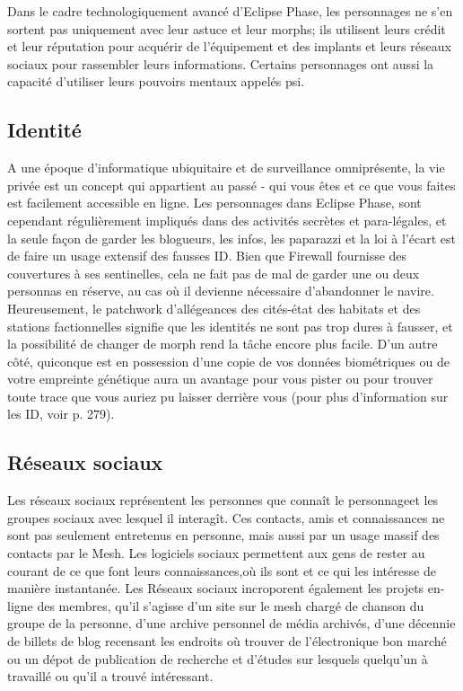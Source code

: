 Dans le cadre technologiquement avancé d'Eclipse Phase, les personnages ne s'en sortent pas uniquement avec leur astuce et leur morphs; ils utilisent leurs crédit et leur réputation pour acquérir de l'équipement et des implants et leurs réseaux sociaux pour rassembler leurs informations. Certains personnages ont aussi la capacité d'utiliser leurs pouvoirs mentaux appelés psi. 

\subsection{Identité} \label{sec:identity} 

A une époque d'informatique ubiquitaire et de surveillance omniprésente, la vie privée est un concept qui appartient au passé - qui vous êtes et ce que vous faites est facilement accessible en ligne. Les personnages dans Eclipse Phase, sont cependant régulièrement impliqués dans des activités secrètes et para-légales, et la seule façon de garder les blogueurs, les infos, les paparazzi et la loi à l'écart est de faire un usage extensif des fausses ID. Bien que Firewall fournisse des couvertures à ses sentinelles, cela ne fait pas de mal de garder une ou deux personnas en réserve, au cas où il devienne nécessaire d'abandonner le navire. Heureusement, le patchwork d'allégeances des cités-état des habitats et des stations factionnelles signifie que les identités ne sont pas trop dures à fausser, et la possibilité de changer de morph rend la tâche encore plus facile. D'un autre côté, quiconque est en possession d'une copie de vos données biométriques ou de votre empreinte génétique aura un avantage pour vous pister ou pour trouver toute trace que vous auriez pu laisser derrière vous (pour plus d'information sur les ID, voir p. 279). 

\subsection{Réseaux sociaux} \label{sec:social-networks} 

Les réseaux sociaux représentent les personnes que connaît le personnageet les groupes sociaux avec lesquel il interagît. Ces contacts, amis et connaissances ne sont pas seulement entretenus en personne, mais aussi par un usage massif des contacts par le Mesh. Les logiciels sociaux permettent aux gens de rester au courant de ce que font leurs connaissances,où ils sont et ce qui les intéresse de manière instantanée. Les Réseaux sociaux incroporent également les projets en-ligne des membres, qu'il s'agisse d'un site sur le mesh chargé de chanson du groupe de la personne, d'une archive personnel de média archivés, d'une décennie de billets de blog recensant les endroits où trouver de l'électronique bon marché ou un dépot de publication de recherche et d'études sur lesquels quelqu'un à travaillé ou qu'il a trouvé intéressant. 

